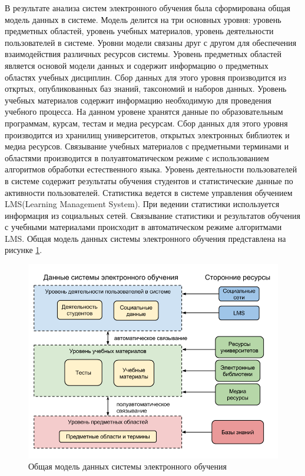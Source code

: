 В результате анализа систем электронного обучения была сформирована общая модель данных в системе. Модель делится на три основных уровня: уровень предметных областей, уровень учебных материалов, уровень деятельности пользователей в системе. Уровни модели связаны друг с другом для обеспечения взаимодействия различных ресурсов системы. Уровень предметных областей является основой модели данных и содержит информацию о предметных областях учебных дисциплин. Сбор данных для этого уровня производится из откртых, опубликованных баз знаний, таксономий и наборов данных. Уровень учебных материалов содержит информацию необходимую для проведения учебного процесса. На данном уровене хранятся данные по образовательным программам, курсам, тестам и медиа ресурсам. Сбор данных для этого уровня производится из хранилищ университетов, открытых электронных библиотек и медиа ресурсов. Связывание учебных материалов с предметными терминами и областями производится в полуавтоматическом режиме с использованием алгоритмов обработки естественного языка. Уровень деятельности пользователей в системе содержит результаты обучения студентов и  статистические данные по активности пользователей. Статистика ведется в системе управления обучением LMS(Learning Management System). При ведении статистики используется информация из социальных сетей. Связывание статистики и результатов обучения с учебными материалами происходит в автоматическом режиме алгоритмами LMS. Общая модель данных системы электронного обучения представлена на рисунке \ref{fig:OverallModel}. 

\begin{figure}[ht] 
  \center
  \includegraphics[scale=0.5]{OverallModel}
  \caption{Общая модель данных системы электронного обучения} 
  \label{fig:OverallModel}
\end{figure}


